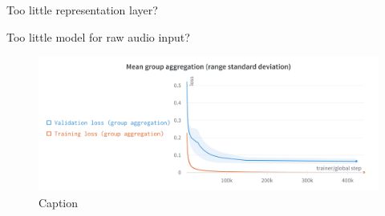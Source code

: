 Too little representation layer?

Too little model for raw audio input? \cite{verydeep}

\begin{figure}[h]
    \centering
    \includegraphics[width=\textwidth]{figures/images/Mean group aggregation.png}
    \caption{Caption}
    \label{fig:enter-label}
\end{figure}



\newpage


